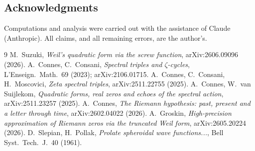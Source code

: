 \documentclass[10pt]{article}
\begin{document}
\subsection*{Acknowledgments}

Computations and analysis were carried out with the assistance of
Claude (Anthropic). All claims, and all remaining errors, are the
author's.

\begin{thebibliography}{9}\small
{} M.~Suzuki, \emph{Weil's quadratic form via the screw
function}, arXiv:2606.09096 (2026).
 A.~Connes, C.~Consani, \emph{Spectral triples and
$\zeta$-cycles}, L'Enseign.\ Math.\ 69 (2023); arXiv:2106.01715.
 A.~Connes, C.~Consani, H.~Moscovici, \emph{Zeta
spectral triples}, arXiv:2511.22755 (2025).
 A.~Connes, W.~van Suijlekom, \emph{Quadratic forms,
real zeros and echoes of the spectral action}, arXiv:2511.23257 (2025).
 A.~Connes, \emph{The Riemann hypothesis: past, present
and a letter through time}, arXiv:2602.04022 (2026).
 A.~Groskin, \emph{High-precision approximation of
Riemann zeros via the truncated Weil form}, arXiv:2605.20224 (2026).
 D.~Slepian, H.~Pollak, \emph{Prolate spheroidal wave
functions...}, Bell Syst.\ Tech.\ J.\ 40 (1961).
\end{thebibliography}
\end{document}

